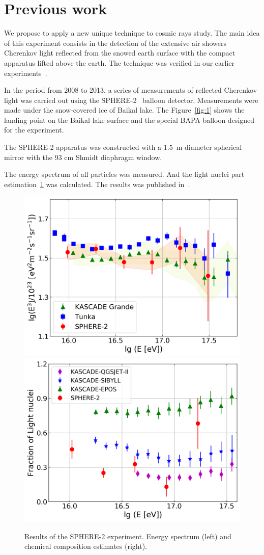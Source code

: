 \documentclass[a4paper,11pt]{article}
\begin{document}
\section{Previous work}

We propose to apply a new unique technique to cosmic rays study. The main idea of this experiment consists in the detection of the extensive air showers Cherenkov light reflected from the snowed earth surface with the compact apparatus lifted above the earth. The technique was verified in our earlier experiments~\cite{1,2}.

In the period from 2008 to 2013, a series of measurements of reflected Cherenkov light was carried out using the SPHERE-2~\cite{1,2,3} balloon detector. Measurements were made under the snow-covered ice of Baikal lake. The Figure~\ref{fig:1} shows the landing point on the Baikal lake surface and the special BAPA balloon designed for the experiment. 

The SPHERE-2 apparatus was constructed with a 1.5~m diameter spherical mirror with the 93 cm Shmidt diaphragm window.

The energy spectrum of all particles was measured. And the light nuclei part estimation~\ref{fig:2} was calculated. The results was published in~\cite{2}. 

\begin{figure}[htbp]
\centering %
\includegraphics[width=.4\textwidth,trim=0 0 0 0,clip]{sphere2spectrum.png}
\qquad
\includegraphics[width=.4\textwidth,origin=c,angle=0]{sphere2composition.png}
\caption{\label{fig:2} Results of the SPHERE-2 experiment. Energy spectrum (left) and chemical composition estimates (right).}
\end{figure}
\end{document}

